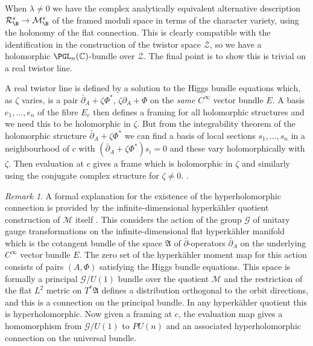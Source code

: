 \documentclass[12pt]{article}
\numberwithin{equation}{section}
\theoremstyle{remark}
\newtheorem{remark}[theorem]{Remark}
\theoremstyle{definition}
\numberwithin{theorem}{section}
\def\C{\mathbb{C}}
\def\M{{\mathcal{M}}}
\newcommand{\calR}{\mathcal{R}}
\renewcommand{\1}{\mathbbm{1}}
\begin{document}
When $\lambda\ne 0$ we have the complex analytically equivalent alternative description $\calR^s_\B\to \M^s_\B$ of the framed moduli space in terms of the character variety, using the holonomy of the flat connection. This  is clearly compatible with the identification in the construction of  the twistor space ${\mathcal Z}$,  so we have a holomorphic $\PGL_n(\C)$-bundle over ${\mathcal Z}$. The final point is to show this is trivial on a real twistor line. 

A real twistor line is defined by  a  solution to the Higgs bundle equations which, as $\zeta$ varies,  is a pair $\bar\partial_A+\zeta\Phi^*$,  $\zeta\partial _A+ \Phi$ on the {\emph {same}} $C^{\infty}$ vector bundle $E$. A basis $e_1,\dots, e_n$ of the fibre $E_c$ then defines a framing for all holomorphic structures and we need this to be holomorphic in $\zeta$. But  from the integrability theorem of the holomorphic structure $\bar\partial_A+\zeta\Phi^*$ we can find a basis of local sections $s_1,\dots, s_n$ in a neighbourhood of $c$   with $(\bar\partial_A+\zeta\Phi^*)s_i=0$ and  these vary holomorphically with $\zeta$. 
Then evaluation at $c$ gives a frame which is holomorphic in $\zeta$ and similarly using the conjugate complex structure for $\zeta\ne 0$. . 




\begin{remark} 
	
	A formal explanation for the  existence of the hyperholomorphic connection is provided by the infinite-dimensional hyperk\"ahler quotient construction of ${\mathcal M}$ itself \cite{hitchin}. This considers the action of the group ${\mathcal G}$ of unitary gauge transformations on the infinite-dimensional flat hyperk\"ahler manifold which is the cotangent bundle of the space ${\mathfrak A}$ of $\bar\partial$-operators $\bar\partial_A$ on the underlying $C^{\infty}$ vector bundle $E$. The zero set of the hyperk\"ahler moment map for this action consists of pairs $(A,\Phi)$ satisfying the Higgs bundle equations. This space is formally a principal ${\mathcal G}/U(1)$ bundle over the quotient ${\mathcal M}$ and the restriction of the flat $L^2$ metric on $T^*{\mathfrak A}$ defines a distribution orthogonal to the orbit directions, and this is a connection on the principal bundle. In any hyperk\"ahler quotient this is hyperholomorphic. Now given a framing at $c$, the evaluation map gives a homomorphism from ${\mathcal G}/U(1)$ to $PU(n)$ and an associated hyperholomorphic connection on the universal bundle.
\end{remark}
\end{document}
